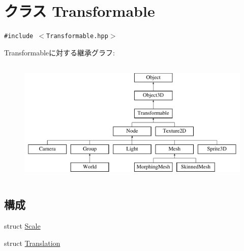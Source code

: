 \hypertarget{classm3g_1_1Transformable}{
\section{クラス Transformable}
\label{classm3g_1_1Transformable}
}
{\tt \#include $<$Transformable.hpp$>$}

Transformableに対する継承グラフ:\begin{figure}[H]
\begin{center}
\leavevmode
\includegraphics[height=6cm]{classm3g_1_1Transformable}
\end{center}
\end{figure}
\subsection*{構成}
\begin{CompactItemize}
\item 
struct \hyperlink{structm3g_1_1Transformable_1_1Scale}{Scale}
\item 
struct \hyperlink{structm3g_1_1Transformable_1_1Translation}{Translation}
\end{CompactItemize}
